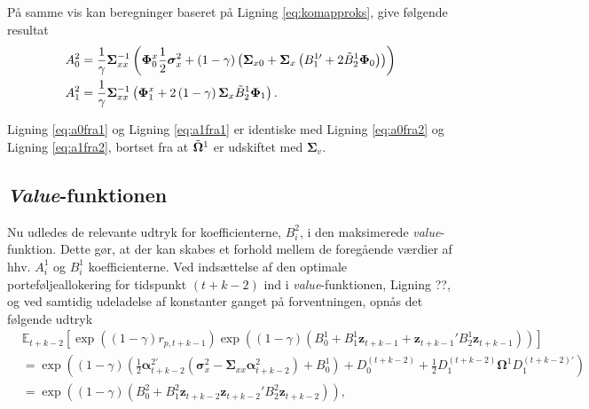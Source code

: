 \documentclass[
  a4paper,
  oneside]{memoir}
\begin{document}
På samme vis kan beregninger baseret på Ligning \eqref{eq:komapproks}, give følgende resultat
\begin{align}
A_0^2&=\frac{1}{\gamma} \bm{\Sigma}_{xx}^{-1} \left(\bm{\Phi}_0^x \frac{1}{2} \bm{\sigma}_x^2 + \left(1-\gamma \right) \left(\bm{\Sigma}_{x0} + \bm{\Sigma}_x \left(B_1^{1\prime} + 2\Tilde{B}_2^{1}\bm{\Phi}_0 \right)\right)\right)\label{eq:a0fra2}\\
A_1^2&=\frac{1}{\gamma} \bm{\Sigma}_{xx}^{-1} \left(\bm{\Phi}_1^x + 2\left(1-\gamma\right) \bm{\Sigma}_x \Tilde{B}_2^{1}\bm{\Phi}_1\right).\label{eq:a1fra2}
\end{align}

Ligning \eqref{eq:a0fra1} og Ligning \eqref{eq:a1fra1} er identiske med Ligning \eqref{eq:a0fra2} og Ligning \eqref{eq:a1fra2}, bortset fra at \(\Tilde{\bm{\Omega}}^1\) er udskiftet med \(\bm{\Sigma}_v\).

\hypertarget{value-funktionen-1}{%
\subsection{\texorpdfstring{\emph{Value}-funktionen}{Value-funktionen}}\label{value-funktionen-1}}

Nu udledes de relevante udtryk for koefficienterne, \(B_i^2\), i den maksimerede \emph{value}-funktion. Dette gør, at der kan skabes et forhold mellem de foregående værdier af hhv. \(A_i^1\) og \(B_i^1\) koefficienterne. Ved indsættelse af den optimale porteføljeallokering for tidspunkt \(\left(t+k-2\right)\) ind i \emph{value}-funktionen, Ligning ??, og ved samtidig udeladelse af konstanter ganget på forventningen, opnås det følgende udtryk
\begin{align*}
&\mathbb{E}_{t+k-2}[ \exp\left( \left(1-\gamma\right)  r_{p,t+k-1}\right)\exp \left( \left(1-\gamma\right) \left(B_0^1 + B_1^1\bm{z}_{t+k-1}  + \bm{z}_{t+k-1}' B_2^1 \bm{z}_{t+k-1}  \right)\right)]\\
&=\exp\left(\left(1-\gamma\right)\left(\frac{1}{2}\bm{\alpha}_{t+k-2}^{2\prime} \left(\bm{\sigma}_x^2 - \bm{\Sigma}_{xx} \bm{\alpha}_{t+k-2}^2\right) + B_0^1 \right) + D_0^{\left(t+k-2\right)} + \frac{1}{2} D_1^{\left(t+k-2\right)} \bm{\Omega}^1 D_1^{\left(t+k-2\right)\prime}\right)\\
&=\exp\left(\left(1-\gamma\right)\left(B_0^2 + B_1^2 \bm{z}_{t+k-2} \bm{z}_{t+k-2}' B_2^2 \bm{z}_{t+k-2} \right)\right),
\end{align*}
\end{document}
